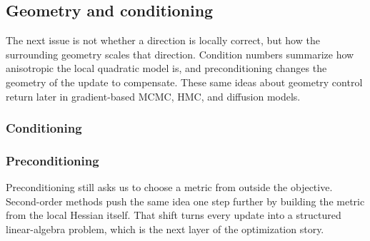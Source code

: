 \subsection{Geometry and conditioning}
\label{subsec:conditioning}

The next issue is not whether a direction is locally correct, but how the surrounding geometry scales that direction.
Condition numbers summarize how anisotropic the local quadratic model is, and preconditioning changes the geometry of the update to compensate.
These same ideas about geometry control return later in gradient-based MCMC, HMC, and diffusion models.

\subsubsection{Conditioning}



\subsubsection{Preconditioning}
\label{subsec:preconditioning}



Preconditioning still asks us to choose a metric from outside the objective.
Second-order methods push the same idea one step further by building the metric from the local Hessian itself.
That shift turns every update into a structured linear-algebra problem, which is the next layer of the optimization story.
